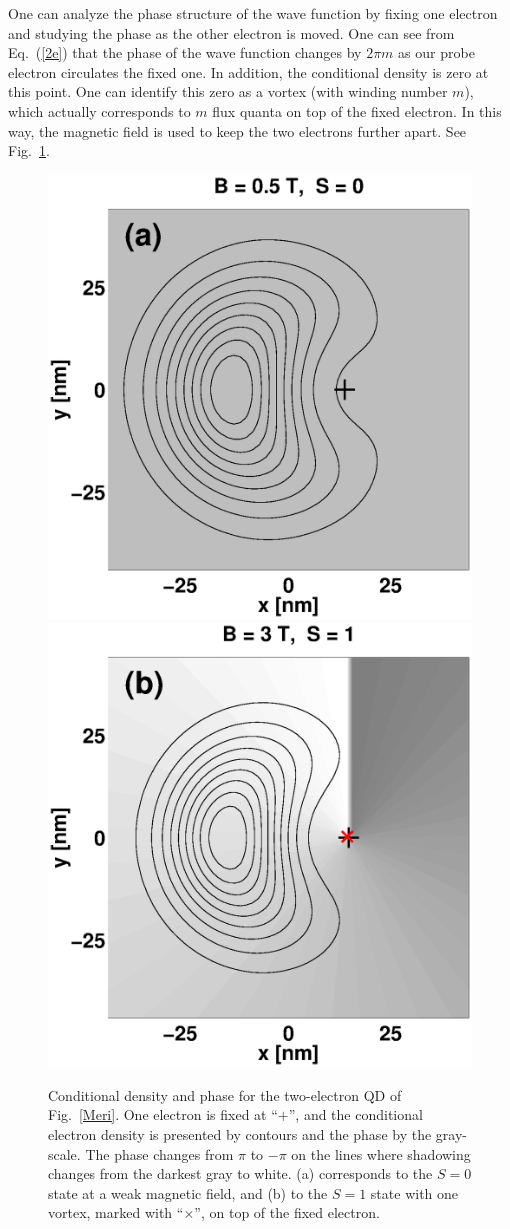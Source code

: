 \documentclass{article}
\begin{document}
One can analyze the phase structure of the wave function by fixing one
electron and studying the phase as the other electron is
moved\cite{vortex,vortex2,vortex3}. One can see from Eq.~(\ref{2e})
that the phase of the wave function changes by $2 \pi m$ as our probe
electron circulates the fixed one. In addition, the conditional
density is zero at this point. One can identify this zero as a vortex
(with winding number $m$)\cite{vortex}, which actually corresponds to
$m$ flux quanta on top of the fixed electron. In this way, the
magnetic field is used to keep the two electrons further apart.  See
Fig.~\ref{2evortices}.
%
\begin{figure}[th]
\includegraphics[width=0.49\columnwidth]{2e0v}
\includegraphics[width=0.49\columnwidth]{2e1v}
\caption{Conditional density and phase for the two-electron QD of
Fig.~\ref{Meri}. One electron is fixed at ``$+$'', and the conditional
electron density is presented by contours and the phase by the
gray-scale.  The phase changes from $\pi$ to $-\pi$ on the lines where
shadowing changes from the darkest gray to white. (a) corresponds to
the $S=0$ state at a weak magnetic field, and (b) to the $S=1$ state
with one vortex, marked with ``$\times$'', on top of the fixed
electron.}
\label{2evortices}
\end{figure}
\end{document}
